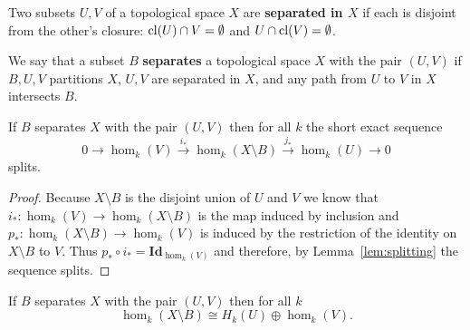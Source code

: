 
\begin{definition}[Separated]
  Two subsets $U, V$ of a topological space $X$ are \textbf{separated in $X$} if each is disjoint from the other's closure: $\mathrm{cl}(U)\cap V =\emptyset$ and $U\cap\mathrm{cl}(V) = \emptyset$.
\end{definition}

\begin{definition}[Separation]
  We say that a subset $B$ \textbf{separates} a topological space $X$ with the pair $(U, V)$ if $B, U, V$ partitions $X$, $U, V$ are separated in $X$, and any path from $U$ to $V$ in $X$ intersects $B$.
\end{definition}

\begin{lemma}\label{lem:separate_splits}
  If $B$ separates $X$ with the pair $(U, V)$ then for all $k$ the short exact sequence
  \[ 0\to \hom_k(V)\xrightarrow{i_*} \hom_k(X\setminus B)\xrightarrow{j_*} \hom_k(U)\to 0\]
  splits.
\end{lemma}
\begin{proof}
  Because $X\setminus B$ is the disjoint union of $U$ and $V$ we know that $i_* : \hom_k(V)\to \hom_k(X\setminus B)$ is the map induced by inclusion and $p_* : \hom_k(X\setminus B)\to \hom_k(V)$ is induced by the restriction of the identity on $X\setminus B$ to $V$.
  Thus $p_*\circ i_* = \mathbf{Id}_{\hom_k(V)}$ and therefore, by Lemma~\ref{lem:splitting} the sequence splits.%
\end{proof}

\begin{corollary}\label{cor:oplus_separates}
    If $B$ separates $X$ with the pair $(U, V)$ then for all $k$
    \[ \hom_k(X\setminus B) \cong H_k(U)\oplus \hom_k(V). \]
\end{corollary}

